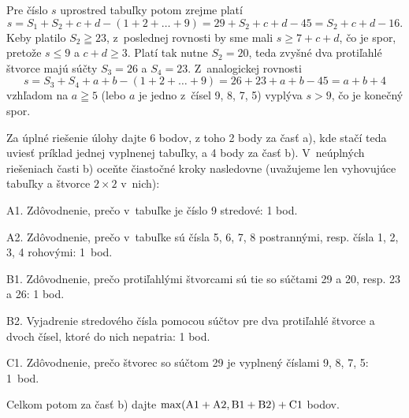 {Pre číslo $s$ uprostred tabuľky potom zrejme platí
$$
s=S_1+S_2+c+d-(1+2+\ldots+9)=29+S_2+c+d-45=S_2+c+d-16.
$$
Keby platilo $S_2\geqq23$, z~poslednej rovnosti by sme mali
$s\geq 7+c+d$, čo je spor, pretože $s\leq9$ a $c+d\geq3$. Platí tak
nutne $S_2=20$, teda zvyšné dva protiľahlé štvorce majú súčty
$S_3=26$ a $S_4=23$. Z~analogickej rovnosti
$$
s=S_3+S_4+a+b-(1+2+\ldots+9)=26+23+a+b-45=a+b+4
$$
vzhľadom na $a\geqq 5$ (lebo $a$ je jedno z~čísel 9, 8, 7, 5)
vyplýva $s>9$, čo je konečný spor.

\schemaABC
Za úplné riešenie úlohy dajte 6 bodov, z toho 2 body za časť a),
kde stačí teda uviesť príklad jednej vyplnenej tabuľky, a 4 body za
časť b). V~neúplných riešeniach časti b) oceňte čiastočné kroky
nasledovne (uvažujeme len vyhovujúce tabuľky a štvorce $2\times2$
v~nich):

\smallskip
\item{A1.} Zdôvodnenie, prečo v~tabuľke je číslo 9 stredové: 1 bod.
\item{A2.} Zdôvodnenie, prečo v~tabuľke sú čísla 5, 6, 7, 8 postrannými, resp. čísla 1, 2, 3, 4 rohovými: 1~bod.
\item{B1.} Zdôvodnenie, prečo protiľahlými štvorcami sú tie so súčtami 29 a 20, resp. 23 a 26: 1 bod.
\item{B2.} Vyjadrenie stredového čísla pomocou súčtov pre dva protiľahlé štvorce a dvoch čísel, ktoré do nich nepatria: 1 bod.
\item{C1.} Zdôvodnenie, prečo štvorec so súčtom 29 je vyplnený číslami 9, 8, 7, 5: 1~bod.

\smallskip\noindent
Celkom potom za časť b) dajte $\rm \max(A1+A2,B1+B2)+C1$ bodov.
\endschema
}


